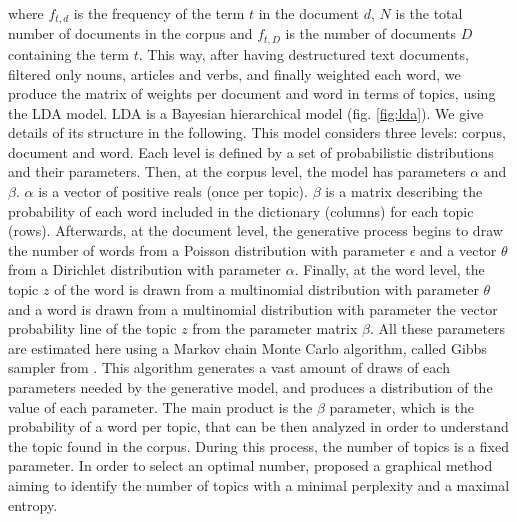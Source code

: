 {where \(f_{t,d}\)  is the frequency of the term \(t\)  in the document \(d\), \(N\) is the total number of documents in the corpus and \(f_{t,D}\) is the number of documents \(D\) containing the term \(t\). This way, after having destructured text documents, filtered only nouns, articles and verbs, and finally weighted each word, we produce the matrix of weights per document and word in terms of topics, using the LDA model. LDA is a Bayesian hierarchical model (fig. \ref{fig:lda}). We give details of its structure in the following. This model considers three levels: corpus, document and word. Each level is defined by a set of probabilistic distributions and their parameters. Then, at the corpus level, the model has parameters \(\alpha\) and \(\beta\). \(\alpha\) is a vector of positive reals (once per topic). \(\beta\) is a matrix describing the probability of each word included in the dictionary (columns) for each topic (rows). Afterwards, at the document level, the generative process begins to draw the number of words from a Poisson distribution with parameter \(\epsilon\) and a vector \(\theta\) from a Dirichlet distribution with parameter \(\alpha\). Finally, at the word level, the topic \(z\) of the word is drawn from a multinomial distribution with parameter \(\theta\) and a word is drawn from a multinomial distribution with parameter the vector probability line of the topic \(z\) from the parameter matrix \(\beta\). All these parameters are estimated here using a Markov chain Monte Carlo algorithm, called Gibbs sampler from \cite{geman_stochastic_1984}. This algorithm generates a vast amount of draws of each parameters needed by the generative model, and produces a distribution of the value of each parameter. The main product is the \(\beta\) parameter, which is the probability of a word per topic, that can be then analyzed in order to understand the topic found in the corpus. During this process, the number of topics is a fixed parameter. In order to select an optimal number,  \cite{blei2003latent} proposed a graphical method aiming to identify the number of topics with a minimal perplexity and a maximal entropy.
}{

}



